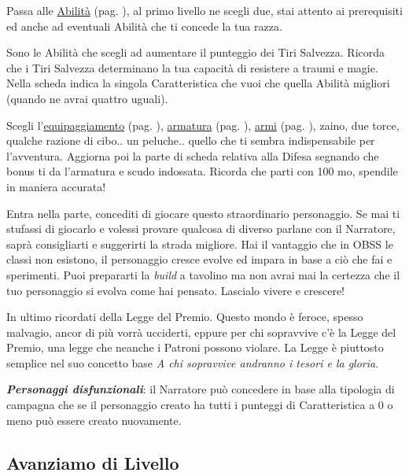 \begin{multicols}{2}
Passa alle \hyperlink{abilita}{Abilità} (pag. \pageref{abilita}), al primo livello ne scegli due, stai attento ai prerequisiti ed anche ad eventuali Abilità che ti concede la tua razza.

Sono le Abilità che scegli ad aumentare il punteggio dei Tiri Salvezza. Ricorda che i Tiri Salvezza determinano la tua capacità di resistere a traumi e magie. Nella scheda indica la singola Caratteristica che vuoi che quella Abilità migliori (quando ne avrai quattro uguali).

Scegli l'\hyperlink{equipaggiamento}{equipaggiamento} (pag. \pageref{equipaggiamento}), \hyperlink{equipaggiamento.armature.scudi}{armatura} (pag. \pageref{equipaggiamentoarmature}), \hyperlink{equipaggiamento.armi}{armi} (pag. \pageref{equipaggiamentoarmi}), zaino, due torce, qualche razione di cibo.. un peluche.. quello che ti sembra indispensabile per l'avventura.
Aggiorna poi la parte di scheda relativa alla Difesa segnando che bonus ti da l'armatura e scudo indossata. Ricorda che parti con 100 mo, spendile in maniera accurata!

Entra nella parte, concediti di giocare questo straordinario personaggio. Se mai ti stufassi di giocarlo e volessi provare qualcosa di diverso parlane con il Narratore, saprà consigliarti e suggerirti la strada migliore.
Hai il vantaggio che in OBSS le classi non esistono, il personaggio cresce evolve ed impara in base a ciò che fai e sperimenti. Puoi prepararti la \emph{build} a tavolino ma non avrai mai la certezza che il tuo personaggio si evolva come hai pensato. Lascialo vivere e crescere!

In ultimo ricordati della Legge del Premio. Questo mondo è feroce, spesso malvagio, ancor di più vorrà ucciderti, eppure per chi sopravvive c'è la Legge del Premio, una legge che neanche i Patroni possono violare. La Legge è piuttosto semplice nel suo concetto base \emph{A chi sopravvive andranno i tesori e la gloria}.


\begin{changemargin}{0.3cm}{0.3cm}\begin{narratore}
\emph{\textbf{Personaggi disfunzionali}}: il Narratore può concedere in base alla tipologia di campagna che se il personaggio creato ha tutti i punteggi di Caratteristica a 0 o meno può essere creato nuovamente.
\end{narratore}\end{changemargin}

\subsection{Avanziamo di Livello}\label{avanzamentodilivello}


\end{multicols}
